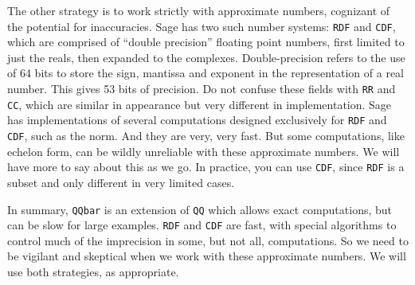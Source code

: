 %
The other strategy is to work strictly with approximate numbers, cognizant of the potential for inaccuracies.  Sage has two such number systems: \verb?RDF? and \verb?CDF?, which are comprised of ``double precision'' floating point numbers, first limited to just the reals, then expanded to the complexes.  Double-precision refers to the use of 64 bits to store the sign, mantissa and exponent in the representation of a real number.  This gives 53 bits of precision.  Do not confuse these fields with \verb?RR? and \verb?CC?, which are similar in appearance but very different in implementation.  Sage has implementations of several computations designed exclusively for \verb?RDF? and \verb?CDF?, such as the norm.  And they are very, very fast.  But some computations, like echelon form, can be wildly unreliable with these approximate numbers.  We will have more to say about this as we go.  In practice, you can use \verb?CDF?, since \verb?RDF? is a subset and only different in very limited cases.\par
%
In summary, \verb?QQbar? is an extension of \verb?QQ? which allows exact computations, but can be slow for large examples.  \verb?RDF? and \verb?CDF? are fast, with special algorithms to control much of the imprecision in some, but not all, computations.  So we need to be vigilant and skeptical when we work with these approximate numbers.  We will use both strategies, as appropriate.